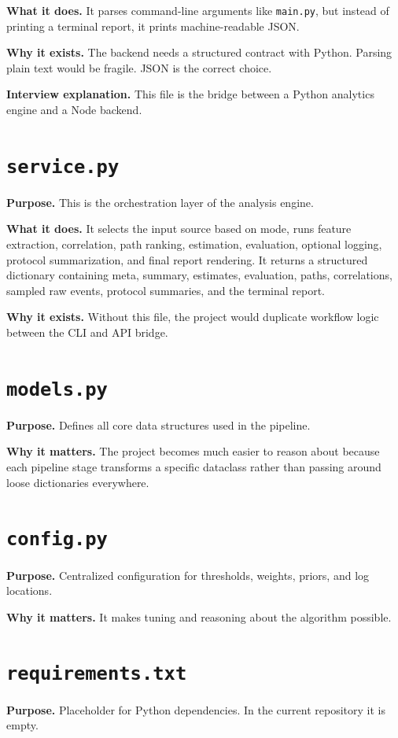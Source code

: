 \documentclass[12pt,a4paper]{report}
\begin{document}
\textbf{What it does.} It parses command-line arguments like \texttt{main.py}, but instead of printing a terminal report, it prints machine-readable JSON.

\textbf{Why it exists.} The backend needs a structured contract with Python. Parsing plain text would be fragile. JSON is the correct choice.

\textbf{Interview explanation.} This file is the bridge between a Python analytics engine and a Node backend.

\section{\texttt{service.py}}
\textbf{Purpose.} This is the orchestration layer of the analysis engine.

\textbf{What it does.} It selects the input source based on mode, runs feature extraction, correlation, path ranking, estimation, evaluation, optional logging, protocol summarization, and final report rendering. It returns a structured dictionary containing meta, summary, estimates, evaluation, paths, correlations, sampled raw events, protocol summaries, and the terminal report.

\textbf{Why it exists.} Without this file, the project would duplicate workflow logic between the CLI and API bridge.

\section{\texttt{models.py}}
\textbf{Purpose.} Defines all core data structures used in the pipeline.

\textbf{Why it matters.} The project becomes much easier to reason about because each pipeline stage transforms a specific dataclass rather than passing around loose dictionaries everywhere.

\section{\texttt{config.py}}
\textbf{Purpose.} Centralized configuration for thresholds, weights, priors, and log locations.

\textbf{Why it matters.} It makes tuning and reasoning about the algorithm possible.

\section{\texttt{requirements.txt}}
\textbf{Purpose.} Placeholder for Python dependencies. In the current repository it is empty.
\end{document}
